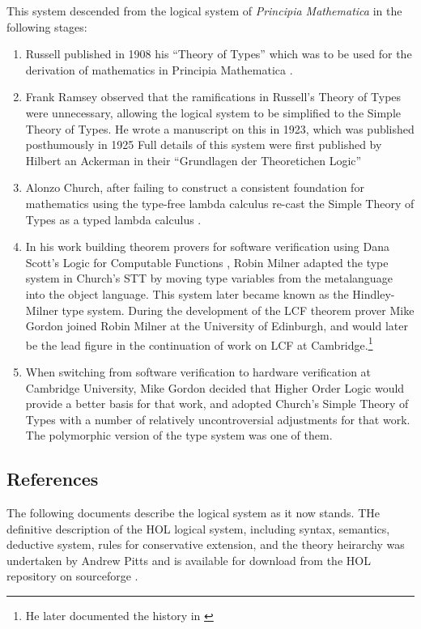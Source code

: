 \documentclass[10pt,titlepage]{book}
\begin{document}
This system descended from the logical system of \emph{Principia Mathematica} in the following stages:

\begin{enumerate}
\item Russell published in 1908 his ``Theory of Types'' \cite{russell1908,heijenoort67} which was to be used for the derivation of mathematics in Principia Mathematica \cite{russell1913}.
\item Frank Ramsey observed that the ramifications in Russell's Theory of Types were unnecessary, allowing the logical system to be simplified to the Simple Theory of Types.
  He wrote a manuscript on this in 1923, which was published posthumously in 1925 \cite{ramsey25,ramsey1931}
  Full details of this system were first published by Hilbert an Ackerman in their ``Grundlagen der Theoretichen Logic'' \cite{hilbert1928}
\item Alonzo Church, after failing to construct a consistent foundation for mathematics using the type-free lambda calculus re-cast the Simple Theory of Types as a typed lambda calculus \cite{churchSTT}.
\item In his work building theorem provers for software verification using Dana Scott's Logic for Computable Functions \cite{scott1993type}, Robin Milner adapted the type system in Church's STT by moving type variables from the metalanguage into the object language.
  This system later became known as the Hindley-Milner type system.
  During the development of the LCF theorem prover Mike Gordon joined Robin Milner at the University of Edinburgh, and would later be the lead figure in the continuation of work on LCF at Cambridge.\footnote{He later documented the history in \cite{gordon2000lcf}}

\item When switching from software verification to hardware verification at Cambridge University, Mike Gordon decided that Higher Order Logic would provide a better basis for that work, and adopted Church's Simple Theory of Types with a number of relatively uncontroversial adjustments for that work.
  The polymorphic version of the type system was one of them.
\end{enumerate}

\subsection{References}

  The following documents describe the logical system as it now stands.
  THe definitive description of the HOL logical system, including syntax, semantics, deductive system, rules for conservative extension, and the theory heirarchy was undertaken by Andrew Pitts and is available for download from the HOL repository on sourceforge \cite{pittsHOLlogic}.
  
\end{document}
